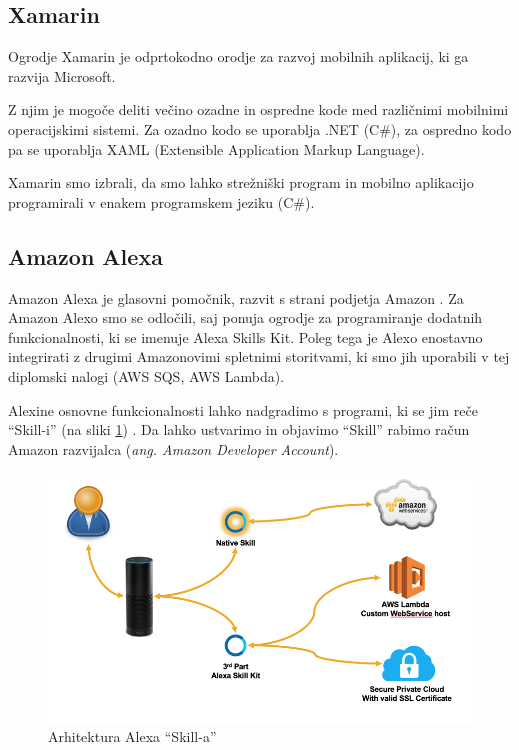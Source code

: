 \documentclass[a4paper, 12pt]{book}
\begin{document}
\subsection{Xamarin}

Ogrodje Xamarin \cite{xamarin} je odprtokodno orodje za razvoj mobilnih aplikacij, ki ga razvija Microsoft. 

Z njim je mogoče deliti večino ozadne in ospredne kode med različnimi mobilnimi operacijskimi sistemi. 
Za ozadno kodo se uporablja .NET (C\#), za ospredno kodo pa se uporablja XAML (Extensible Application Markup Language).

Xamarin smo izbrali, da smo lahko strežniški program in mobilno aplikacijo programirali v enakem programskem jeziku (C\#).

\subsection{Amazon Alexa}


Amazon Alexa je glasovni pomočnik, razvit s strani podjetja Amazon \cite{alexa}.
Za Amazon Alexo smo se odločili, saj ponuja ogrodje za programiranje dodatnih funkcionalnosti, ki se imenuje Alexa Skills Kit.
Poleg tega je Alexo enostavno integrirati z drugimi Amazonovimi spletnimi storitvami, ki smo jih uporabili v tej diplomski nalogi (AWS SQS, AWS Lambda).


Alexine osnovne funkcionalnosti lahko nadgradimo s programi, ki se jim reče \enquote{Skill-i} (na sliki \ref{alexa_architecture}) \cite{alexaskills, alexaarchitecture}.
Da lahko ustvarimo in objavimo \enquote{Skill} rabimo račun Amazon razvijalca (\textit{ang. Amazon Developer Account}).

\begin{figure}[H]
\begin{center}
\includegraphics[width=13cm]{alexa_architecture}
\end{center}
\caption{Arhitektura Alexa \enquote{Skill-a}}
\label{alexa_architecture}
\end{figure}
\end{document}
